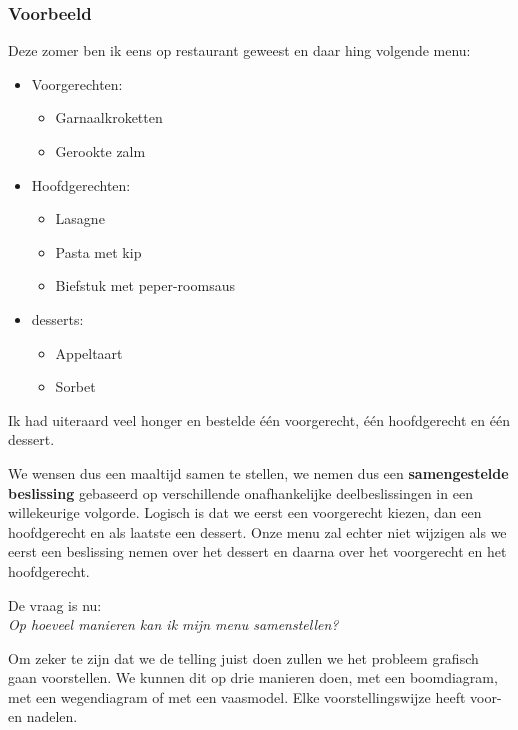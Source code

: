 \documentclass[12pt,twoside]{article}
\begin{document}
\begin{theorie}

\subsubsection*{Voorbeeld}

Deze zomer ben ik eens op restaurant geweest en daar hing volgende menu:

\begin{mdframed}
\begin{itemize}
  \item Voorgerechten:
  \begin{itemize}
    \item Garnaalkroketten
    \item Gerookte zalm
  \end{itemize}
  \item Hoofdgerechten:
  \begin{itemize}
    \item Lasagne
    \item Pasta met kip
    \item Biefstuk met peper-roomsaus
  \end{itemize}
  \item desserts:
  \begin{itemize}
    \item Appeltaart
    \item Sorbet
  \end{itemize}
\end{itemize}
\end{mdframed}

Ik had uiteraard veel honger en bestelde één voorgerecht, één hoofdgerecht en één dessert.

We wensen dus een maaltijd samen te stellen, we nemen dus een {\bf samengestelde beslissing} gebaseerd op verschillende onafhankelijke deelbeslissingen in een willekeurige volgorde. Logisch is dat we eerst een voorgerecht kiezen, dan een hoofdgerecht en als laatste een dessert. Onze menu zal echter niet wijzigen als we eerst een beslissing nemen over het dessert en daarna over het voorgerecht en het hoofdgerecht.

De vraag is nu:\\
{\em Op hoeveel manieren kan ik mijn menu samenstellen?}

Om zeker te zijn dat we de telling juist doen zullen we het probleem grafisch gaan voorstellen. We kunnen dit op drie manieren doen, met een boomdiagram, met een wegendiagram of met een vaasmodel. Elke voorstellingswijze heeft voor- en nadelen.


\end{theorie}
\end{document}
